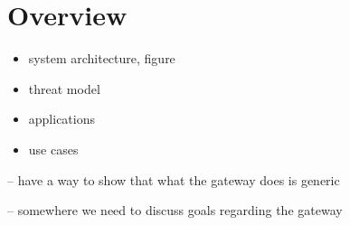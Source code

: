 \section{Overview}\label{sec:overview}

\begin{itemize}
\item system architecture, figure
\item threat model
\item applications
\item use cases
\end{itemize}

-- have a way to show that what the gateway does is generic 
   
-- somewhere we need to discuss goals regarding the gateway
